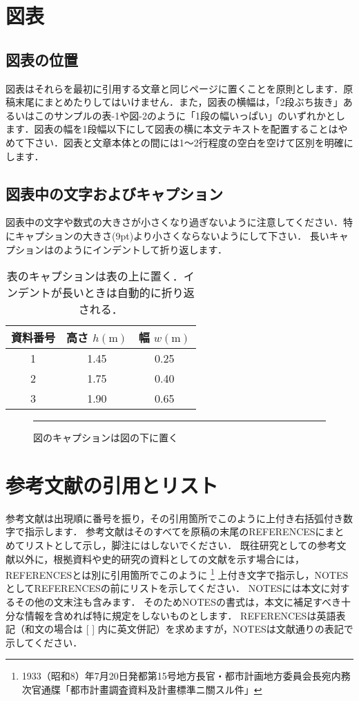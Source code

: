 \documentclass{jjsce}
\begin{document}
\section{図表}
\subsection{図表の位置}
図表はそれらを最初に引用する文章と同じページに置くことを原則とします．原稿末尾にまとめたりしてはいけません．また，図表の横幅は，「2段ぶち抜き」あるいはこのサンプルの表-1や図-2のように「1段の幅いっぱい」のいずれかとします．図表の幅を1段幅以下にして図表の横に本文テキストを配置することはやめて下さい．図表と文章本体との間には1～2行程度の空白を空けて区別を明確にします．

\subsection{図表中の文字およびキャプション}
図表中の文字や数式の大きさが小さくなり過ぎないように注意してください．特にキャプションの大きさ(9pt)より小さくならないようにして下さい．
長いキャプションはのようにインデントして折り返します．


\begin{table}[htb]
\caption{表のキャプションは表の上に置く．インデントが長いときは自動的に折り返される．}
\label{tab:sample}
\centering
\begin{tabular}{|c|c|c|}\hline
資料番号 & 高さ $h(\mathrm{m})$ &幅 $w(\mathrm{m})$ \\\hline
1 & 1.45 & 0.25\\
2 & 1.75 & 0.40\\
3 & 1.90 & 0.65\\\hline
\end{tabular}
\end{table}



\begin{figure}[htb]
\centering
\rule{20mm}{20mm}
\caption{図のキャプションは図の下に置く}
\label{fig:sample}
\end{figure}


\section{参考文献の引用とリスト}

参考文献は出現順に番号を振り，その引用箇所でこのように\cite{a}上付き右括弧付き数字で指示します．
参考文献はそのすべてを原稿の末尾のREFERENCESにまとめてリストとして示し，脚注にはしないでください．
既往研究としての参考文献以外に，根拠資料や史的研究の資料としての文献を示す場合には，REFERENCESとは別に引用箇所でこのように
\footnote{1933（昭和8）年7月20日発都第15号地方長官・都市計画地方委員会長宛内務次官通牒「都市計畫調査資料及計畫標準ニ關スル件」}
上付き文字で指示し，NOTESとしてREFERENCESの前にリストを示してください．
NOTESには本文に対するその他の文末注も含みます．
そのためNOTESの書式は，本文に補足すべき十分な情報を含めれば特に規定をしないものとします．
REFERENCESは英語表記（和文の場合は [ ] 内に英文併記）を求めますが，NOTESは文献通りの表記で示してください．
\end{document}
